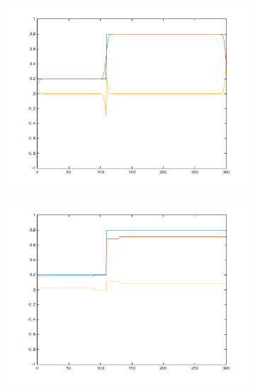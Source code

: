 \begin{figure}[htbp]
    \centering
    \begin{subfigure}[b]{0.48\textwidth}
        \includegraphics[width=\textwidth]{./Template_Figures/unsharp_proper}
        \caption{}\label{fig:cornsweet}
    \end{subfigure}
    \begin{subfigure}[b]{0.48\textwidth}
        \includegraphics[width=\textwidth]{./Template_Figures/unsharp_epipolar}
        \caption{}\label{fig:no_cornsweet}
    \end{subfigure}


\end{figure}
